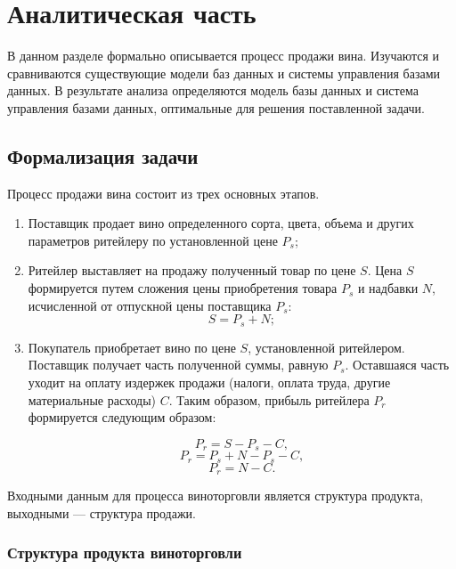 \chapter{Аналитическая часть}

В данном разделе формально описывается процесс продажи вина. Изучаются и сравниваются существующие модели баз данных и системы управления базами данных. В результате анализа определяются модель базы данных и система управления базами данных, оптимальные для решения поставленной задачи.

\section{Формализация задачи}

Процесс продажи вина состоит из трех основных этапов.

\begin{enumerate}
	\item Поставщик продает вино определенного сорта, цвета, объема и других параметров ритейлеру по установленной цене $P_{s}$;
	\item Ритейлер выставляет на продажу полученный товар по цене $S$. Цена $S$ формируется путем сложения цены приобретения товара $P_{s}$ и надбавки $N$, исчисленной от отпускной цены поставщика $P_{s}$:
\begin{equation}
    S = P_{s} + N;
\end{equation}
	\item Покупатель приобретает вино по цене $S$, установленной ритейлером. Поставщик получает часть полученной суммы, равную $P_{s}$. Оставшаяся часть уходит на оплату издержек продажи (налоги, оплата труда, другие материальные расходы) $C$. Таким образом, прибыль ритейлера $P_{r}$ формируется следующим образом:
	
\begin{equation}
    P_{r} = S - P_{s} - C,
\end{equation}
\begin{equation}
    P_{r} = P_{s} + N - P_{s} - C,
\end{equation}
\begin{equation}
    P_{r} = N - C.
\end{equation}
\end{enumerate}

Входными данным для процесса виноторговли является структура продукта, выходными --- структура продажи.

\subsection{Структура продукта виноторговли}

